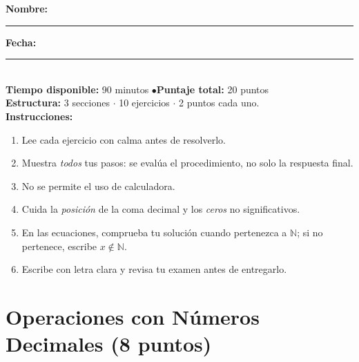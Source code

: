 \documentclass[12pt, letterpaper]{article}
\newcommand{\N}{\mathbb{N}}
\begin{document}


\vspace{4pt}
\begin{cuadroinfo}
  \small
  \textbf{Nombre:} \rule{0.55\linewidth}{0.4pt} \quad \textbf{Fecha:} \rule{0.15\linewidth}{0.4pt} \\[6pt]
  \textbf{Tiempo disponible:} 90 minutos \quad$\bullet$\quad \textbf{Puntaje total:} 20 puntos \\[4pt]
  \textbf{Estructura:} 3 secciones $\cdot$ 10 ejercicios $\cdot$ 2 puntos cada uno. \\[4pt]
  \textbf{Instrucciones:}
  \begin{enumerate}[leftmargin=*]
    \item Lee cada ejercicio con calma antes de resolverlo.
    \item Muestra \emph{todos} tus pasos: se evalúa el procedimiento, no solo la respuesta final.
    \item No se permite el uso de calculadora.
    \item Cuida la \emph{posición} de la coma decimal y los \emph{ceros} no significativos.
    \item En las ecuaciones, comprueba tu solución cuando pertenezca a $\N$; si no pertenece, escribe $x \notin \N$.
    \item Escribe con letra clara y revisa tu examen antes de entregarlo.
  \end{enumerate}
\end{cuadroinfo}

\vspace{8pt}

\section{Operaciones con Números Decimales (8 puntos)}
\end{document}
